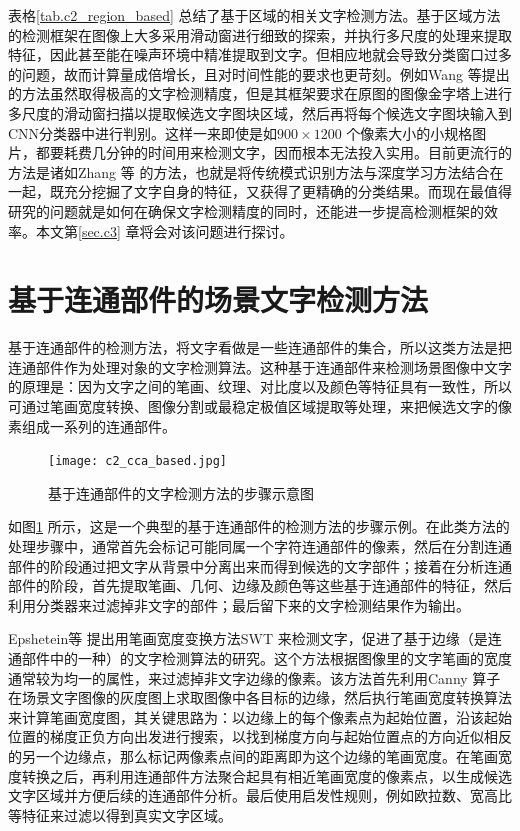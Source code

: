     表格\ref{tab.c2_region_based} 总结了基于区域的相关文字检测方法。基于区域方法的检测框架在图像上大多采用滑动窗进行细致的探索，并执行多尺度的处理来提取特征，因此甚至能在噪声环境中精准提取到文字。但相应地就会导致分类窗口过多的问题，故而计算量成倍增长，且对时间性能的要求也更苛刻。例如Wang 等\cite{Wang2012End}提出的方法虽然取得极高的文字检测精度，但是其框架要求在原图的图像金字塔上进行多尺度的滑动窗扫描以提取候选文字图块区域，然后再将每个候选文字图块输入到CNN分类器中进行判别。这样一来即使是如$900\times1200$ 个像素大小的小规格图片，都要耗费几分钟的时间用来检测文字，因而根本无法投入实用。目前更流行的方法是诸如Zhang 等\cite{Zhang2015Symmetry} 的方法，也就是将传统模式识别方法与深度学习方法结合在一起，既充分挖掘了文字自身的特征，又获得了更精确的分类结果。而现在最值得研究的问题就是如何在确保文字检测精度的同时，还能进一步提高检测框架的效率。本文第\ref{sec.c3} 章将会对该问题进行探讨。

    \section{基于连通部件的场景文字检测方法}

    基于连通部件的检测方法，将文字看做是一些连通部件的集合，所以这类方法是把连通部件作为处理对象的文字检测算法。这种基于连通部件来检测场景图像中文字的原理是：因为文字之间的笔画、纹理、对比度以及颜色等特征具有一致性，所以可通过笔画宽度转换、图像分割或最稳定极值区域提取等处理，来把候选文字的像素组成一系列的连通部件。

    \begin{figure}[!h]
    \centering
    \texttt{[image: c2\_cca\_based.jpg]}
    \caption{基于连通部件的文字检测方法的步骤示意图}
    \label{fig.c2_cca_based}
    \end{figure}

    如图\ref{fig.c2_cca_based} 所示，这是一个典型的基于连通部件的检测方法的步骤示例。在此类方法的处理步骤中，通常首先会标记可能同属一个字符连通部件的像素，然后在分割连通部件的阶段通过把文字从背景中分离出来而得到候选的文字部件；接着在分析连通部件的阶段，首先提取笔画、几何、边缘及颜色等这些基于连通部件的特征，然后利用分类器来过滤掉非文字的部件；最后留下来的文字检测结果作为输出。

    Epshetein等\cite{Epshtein2010Detecting} 提出用笔画宽度变换方法SWT 来检测文字，促进了基于边缘（是连通部件中的一种）的文字检测算法的研究。这个方法根据图像里的文字笔画的宽度通常较为均一的属性，来过滤掉非文字边缘的像素。该方法首先利用Canny 算子在场景文字图像的灰度图上求取图像中各目标的边缘，然后执行笔画宽度转换算法来计算笔画宽度图，其关键思路为：以边缘上的每个像素点为起始位置，沿该起始位置的梯度正负方向出发进行搜索，以找到梯度方向与起始位置点的方向近似相反的另一个边缘点，那么标记两像素点间的距离即为这个边缘的笔画宽度。在笔画宽度转换之后，再利用连通部件方法聚合起具有相近笔画宽度的像素点，以生成候选文字区域并方便后续的连通部件分析。最后使用启发性规则，例如欧拉数、宽高比等特征来过滤以得到真实文字区域。

